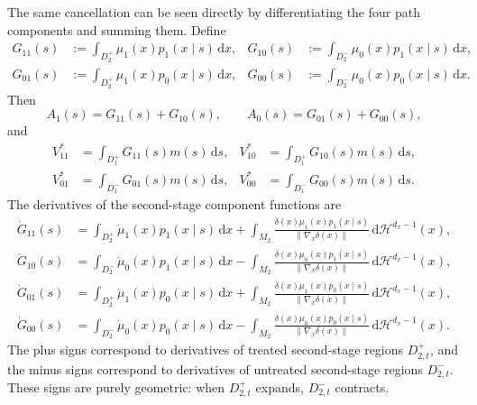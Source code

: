 \documentclass[12pt]{article}
\newcommand{\1}{\mathbf{1}}
\begin{document}
The same cancellation can be seen directly by differentiating the four path
components and summing them. Define
\begin{align*}
G_{11}(s)
&:=
\int_{D_2^+}\mu_1(x)p_1(x\mid s)\,\mathrm dx,
&
G_{10}(s)
&:=
\int_{D_2^-}\mu_0(x)p_1(x\mid s)\,\mathrm dx, \\
G_{01}(s)
&:=
\int_{D_2^+}\mu_1(x)p_0(x\mid s)\,\mathrm dx,
&
G_{00}(s)
&:=
\int_{D_2^-}\mu_0(x)p_0(x\mid s)\,\mathrm dx.
\end{align*}
Then
\[
A_1(s)=G_{11}(s)+G_{10}(s),
\qquad
A_0(s)=G_{01}(s)+G_{00}(s),
\]
and
\begin{align*}
V_{11}^*
&=
\int_{D_1^+}G_{11}(s)m(s)\,\mathrm ds,
&
V_{10}^*
&=
\int_{D_1^+}G_{10}(s)m(s)\,\mathrm ds, \\
V_{01}^*
&=
\int_{D_1^-}G_{01}(s)m(s)\,\mathrm ds,
&
V_{00}^*
&=
\int_{D_1^-}G_{00}(s)m(s)\,\mathrm ds.
\end{align*}
The derivatives of the second-stage component functions are
\begin{align*}
\dot G_{11}(s)
&=
\int_{D_2^+}\dot\mu_1(x)p_1(x\mid s)\,\mathrm dx
+
\int_{M_2}
\frac{\dot\delta(x)\mu_1(x)p_1(x\mid s)}
{\lVert\nabla_x\delta(x)\rVert}
\,\mathrm d\mathcal H^{d_x-1}(x), \\
\dot G_{10}(s)
&=
\int_{D_2^-}\dot\mu_0(x)p_1(x\mid s)\,\mathrm dx
-
\int_{M_2}
\frac{\dot\delta(x)\mu_0(x)p_1(x\mid s)}
{\lVert\nabla_x\delta(x)\rVert}
\,\mathrm d\mathcal H^{d_x-1}(x), \\
\dot G_{01}(s)
&=
\int_{D_2^+}\dot\mu_1(x)p_0(x\mid s)\,\mathrm dx
+
\int_{M_2}
\frac{\dot\delta(x)\mu_1(x)p_0(x\mid s)}
{\lVert\nabla_x\delta(x)\rVert}
\,\mathrm d\mathcal H^{d_x-1}(x), \\
\dot G_{00}(s)
&=
\int_{D_2^-}\dot\mu_0(x)p_0(x\mid s)\,\mathrm dx
-
\int_{M_2}
\frac{\dot\delta(x)\mu_0(x)p_0(x\mid s)}
{\lVert\nabla_x\delta(x)\rVert}
\,\mathrm d\mathcal H^{d_x-1}(x).
\end{align*}
The plus signs correspond to derivatives of treated second-stage regions
$D_{2,t}^+$, and the minus signs correspond to derivatives of untreated
second-stage regions $D_{2,t}^-$. These signs are purely geometric: when
$D_{2,t}^+$ expands, $D_{2,t}^-$ contracts.
\end{document}
